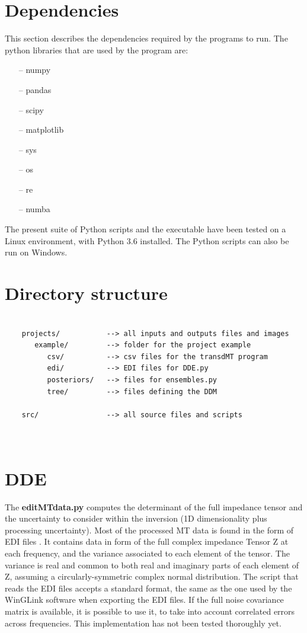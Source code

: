\documentclass[]{scrartcl}
\begin{document}
	
	
	\section{Dependencies}
	
	This section describes the dependencies required by the programs to run.
	The python libraries that are used by the program are:
	
	\begin{itemize}
	\item[--] numpy
	\item[--] pandas
	\item[--] scipy
	\item[--] matplotlib
	\item[--] sys
	\item[--] os
	\item[--] re
	\item[--] numba
	\end{itemize}
	
	The present suite of Python scripts and the executable have been tested on a Linux environment, with Python 3.6 installed. The Python scripts can also be run on Windows.
	
	\section{Directory structure}
	
	\begin{verbatim}
	
	projects/           --> all inputs and outputs files and images
	   example/         --> folder for the project example
	      csv/          --> csv files for the transdMT program
	      edi/          --> EDI files for DDE.py
	      posteriors/   --> files for ensembles.py
	      tree/         --> files defining the DDM
	
	src/                --> all source files and scripts

	
	\end{verbatim}
	
	\section{DDE}
	The \textbf{editMTdata.py} computes the determinant of the full impedance tensor and the uncertainty to consider within the inversion (1D dimensionality plus processing uncertainty).
	Most of the processed MT data is found in the form of EDI files \citep{Wight1987}. It contains data in form of the full complex impedance Tensor Z at each frequency, and the variance associated to each element of the tensor. The variance is real and common to both real and imaginary parts of each element of Z, assuming a circularly-symmetric complex normal distribution. The script that reads the EDI files accepts a standard format, the same as the one used by the WinGLink software when exporting the EDI files.   
	If the full noise covariance matrix is available, it is possible to use it, to take into account correlated errors across frequencies. This implementation has not been tested thoroughly yet. %
\end{document}
